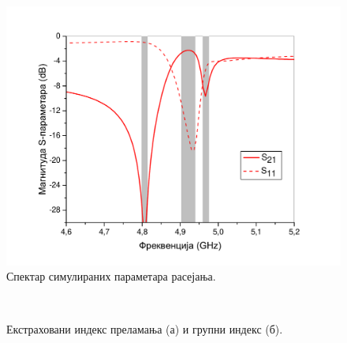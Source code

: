 \documentclass[main.tex]{subfiles}
\begin{document}
\begin{figure}[h!]
    \centering
    \includegraphics[width=0.8\linewidth]{sl_eit/mag.pdf}
    \caption{Спектар симулираних параметара расејања.}
    \label{fig:sl_eit/mag}
\end{figure}
\begin{figure}[h!]
    \centering
    \\
    \caption{Екстраховани индекс преламања (а) и групни индекс (б).}
    \label{fig:indeksi}
\end{figure}
\end{document}
